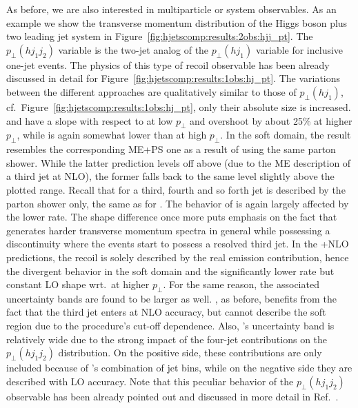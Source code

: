 As before, we are also interested in multiparticle or system
observables. As an example we show the transverse momentum
distribution of the Higgs boson plus two leading jet system in
Figure~\ref{fig:hjetscomp:results:2obs:hjj_pt}. The $p_\perp(hj_1j_2)$
variable is the two-jet analog of the $p_\perp(hj_1)$ variable for
inclusive one-jet events. The physics of this type of recoil
observable has been already discussed in detail for 
Figure~\ref{fig:hjetscomp:results:1obs:hj_pt}. The variations between 
the different approaches are qualitatively similar to those of 
$p_\perp(hj_1)$, cf.\ Figure~\ref{fig:hjetscomp:results:1obs:hj_pt}, 
only their absolute size is increased. \hjetscompMGaMC and \hjetscompSherpa have a slope with respect
to \hjetscompPowheg at low $p_\perp$ and overshoot by about 25\% at higher
$p_\perp$, while \hjetscompHerwig is again somewhat lower than \hjetscompPowheg at high
$p_\perp$. In the soft domain, the \hjetscompSherpa \hjetscompNNLOPS result resembles
the corresponding ME+PS one as a result of using the same parton
shower. While the latter prediction levels off above \hjetscompPowheg (due to
the ME description of a third jet at NLO), the former falls back to
the same level slightly above the plotted range. Recall that for 
\hjetscompSherpa \hjetscompNNLOPS a third, fourth and so
forth jet is described by the parton shower only, the same as for \hjetscompPowheg.
The behavior of \hjetscompHej is again largely affected by the lower rate. The
shape difference once more puts emphasis on the fact that \hjetscompHej
generates harder transverse momentum spectra in general while possessing 
a discontinuity where the events start to possess a resolved third jet. 
In the \hjetscompGoSam{}+\hjetscompSherpa NLO predictions, the recoil is solely
described by the real emission contribution, hence the divergent
behavior in the soft domain and the significantly lower rate but
constant LO shape wrt.~\hjetscompPowheg at higher $p_\perp$. For the same
reason, the associated uncertainty bands are found to be larger as
well. \hjetscompLoopsim, as before, benefits from the fact that the third
jet enters at NLO accuracy, but cannot describe the soft region due to
the procedure's cut-off dependence. Also, \hjetscompLoopsim's uncertainty band
is relatively wide due to the strong impact of the four-jet
contributions on the $p_\perp(hj_1j_2)$ distribution. On the positive
side, these contributions are only included because of \hjetscompLoopsim's
combination of jet bins, while on the negative side they are described
with  LO accuracy. Note that this peculiar behavior of the
$p_\perp(hj_1j_2)$ observable has been already pointed out and
discussed in more detail in Ref.~\cite{Greiner:2015jha}.

